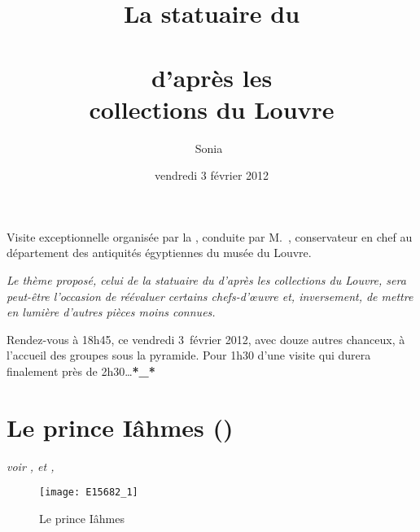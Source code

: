 \documentclass[dvipsnames,a4paper,twoside,10pt,openany,article]{memoir}
\title{La statuaire du\\\NK\\d'après les\\collections du Louvre}
\subtitle{}
\author{Sonia~\bsc{Labetoulle}}
\date{vendredi 3 février 2012}
\newcommand{\DirUtils}{../../utils}
\begin{document}


\thispagestyle{empty}
\maketitle





\frontmatter
\tableofcontents


\mainmatter

\begin{encadre}
  Visite exceptionnelle organisée par la \SFE, conduite par 
  M.~, conservateur en chef au département des antiquités 
  égyptiennes du musée du Louvre.

  \emph{\og Le thème proposé, celui de la statuaire du \NK d'après 
  les collections du Louvre, sera peut-être l'occasion de réévaluer 
  certains chefs-d'\oe uvre et, inversement, de mettre en lumière 
  d'autres pièces moins connues. \fg}

  Rendez-vous à 18h45, ce vendredi 3~février 2012, avec douze autres 
  chanceux, à l'accueil des groupes sous la pyramide. Pour 1h30 d'une 
  visite qui durera finalement près de 2h30\dots \textbf{*\_*}
\end{encadre}


\chapter{Le prince Iâhmes ()}
\label{sec:E15682}

\puceb{} \emph{voir ,  et 
, }
\bigskip

\begin{figure}[!h]
  \texttt{[image: E15682\_1]}
  \caption{Le prince Iâhmes }
  \label{fig:E15682}
\end{figure}
\end{document}
